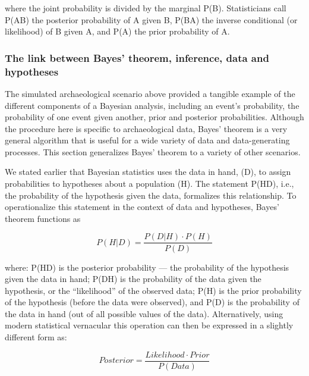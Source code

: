 \documentclass[
]{article}
\begin{document}
where the joint probability is divided by the marginal P(B).
Statisticians call P(A\textbar B) the posterior probability of A given
B, P(B\textbar A) the inverse conditional (or likelihood) of B given A,
and P(A) the prior probability of A.

\hypertarget{the-link-between-bayes-theorem-inference-data-and-hypotheses}{%
\subsubsection{The link between Bayes' theorem, inference, data and
hypotheses}\label{the-link-between-bayes-theorem-inference-data-and-hypotheses}}

The simulated archaeological scenario above provided a tangible example
of the different components of a Bayesian analysis, including an event's
probability, the probability of one event given another, prior and
posterior probabilities. Although the procedure here is specific to
archaeological data, Bayes' theorem is a very general algorithm that is
useful for a wide variety of data and data-generating processes. This
section generalizes Bayes' theorem to a variety of other scenarios.

We stated earlier that Bayesian statistics uses the data in hand, (D),
to assign probabilities to hypotheses about a population (H). The
statement P(H\textbar D), i.e., the probability of the hypothesis given
the data, formalizes this relationship. To operationalize this statement
in the context of data and hypotheses, Bayes' theorem functions as

\begin{equation}
P(H|D) = \frac{P(D|H)\cdot P(H)}{P(D)}
\label{eg:3}
\end{equation}

where: P(H\textbar D) is the posterior probability --- the probability
of the hypothesis given the data in hand; P(D\textbar H) is the
probability of the data given the hypothesis, or the ``likelihood'' of
the observed data; P(H) is the prior probability of the hypothesis
(before the data were observed), and P(D) is the probability of the data
in hand (out of all possible values of the data). Alternatively, using
modern statistical vernacular this operation can then be expressed in a
slightly different form as:

\begin{equation}
Posterior  = \frac{Likelihood \cdot Prior}{P(Data)}
\label{eg:4}
\end{equation}
\end{document}
